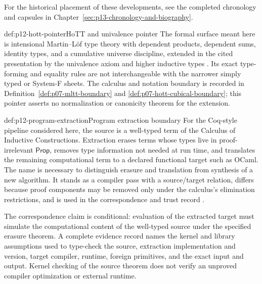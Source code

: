 For the historical placement of these developments, see the completed
chronology and capsules in Chapter~\ref{sec:p13-chronology-and-biography}.

\begin{proofboundary}{def:p12-hott-pointer}{HoTT and univalence pointer}
The formal surface meant here is intensional Martin--L\"of type theory with
dependent products, dependent sums, identity types, and a cumulative universe
discipline, extended in the cited presentation by the univalence axiom and
higher inductive types \cite{HoTTBook2013}. Its exact type-forming and equality
rules are not interchangeable with the narrower simply typed or System-F
sheets. The calculus and notation boundary is recorded in
Definition~\ref{def:p07-mltt-boundary} and
\ref{def:p07-hott-cubical-boundary}; this pointer asserts no normalization or
canonicity theorem for the extension.
\end{proofboundary}

\begin{hbdefinition}{def:p12-program-extraction}{Program extraction boundary}
For the Coq-style pipeline considered here, the source is a well-typed term of
the Calculus of Inductive Constructions. Extraction erases terms whose types
live in proof-irrelevant \(\mathsf{Prop}\), removes type information not needed
at run time, and translates the remaining computational term to a declared
functional target such as OCaml. The name is necessary to distinguish erasure
and translation from synthesis of a new algorithm. It stands as a compiler
pass with a source/target relation, differs because proof components may be
removed only under the calculus's elimination restrictions, and is used in the
correspondence and trust record \cite{Letouzey2008}.
\end{hbdefinition}

The correspondence claim is conditional: evaluation of the extracted target
must simulate the computational content of the well-typed source under the
specified erasure theorem. A complete evidence record names the kernel and
library assumptions used to type-check the source, extraction implementation
and version, target compiler, runtime, foreign primitives, and the exact input
and output. Kernel checking of the source theorem does not verify an unproved
compiler optimization or external runtime.

